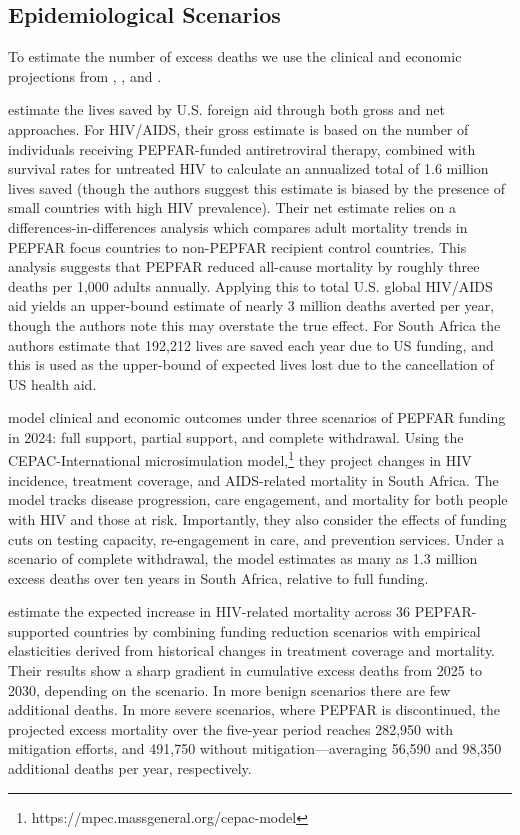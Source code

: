 \documentclass[letterpaper,12pt]{article}
\theoremstyle{definition}
\begin{document}
\begin{spacing}{1.5}
\subsection{Epidemiological Scenarios}
To estimate the number of excess deaths we use the clinical and economic projections from \citet{KS2025}, \citet{Gandhi2025}, and \citet{Brink2025}.

\citet{KS2025} estimate the lives saved by U.S. foreign aid through both gross and net approaches. For HIV/AIDS, their gross estimate is based on the number of individuals receiving PEPFAR-funded antiretroviral therapy, combined with survival rates for untreated HIV to calculate an annualized total of 1.6 million lives saved (though the authors suggest this estimate is biased by the presence of small countries with high HIV prevalence). Their net estimate relies on a differences-in-differences analysis which compares adult mortality trends in PEPFAR focus countries to non-PEPFAR recipient control countries. This analysis suggests that PEPFAR reduced all-cause mortality by roughly three deaths per 1,000 adults annually. Applying this to total U.S. global HIV/AIDS aid yields an upper-bound estimate of nearly 3 million deaths averted per year, though the authors note this may overstate the true effect. For South Africa the authors estimate that 192,212 lives are saved each year due to US funding, and this is used as the upper-bound of expected lives lost due to the cancellation of US health aid.

\citet{Gandhi2025} model clinical and economic outcomes under three scenarios of PEPFAR funding in 2024: full support, partial support, and complete withdrawal. Using the CEPAC-International microsimulation model,\footnote{https://mpec.massgeneral.org/cepac-model} they project changes in HIV incidence, treatment coverage, and AIDS-related mortality in South Africa. The model tracks disease progression, care engagement, and mortality for both people with HIV and those at risk. Importantly, they also consider the effects of funding cuts on testing capacity, re-engagement in care, and prevention services. Under a scenario of complete withdrawal, the model estimates as many as 1.3 million excess deaths over ten years in South Africa, relative to full funding.

 estimate the expected increase in HIV-related mortality across 36 PEPFAR-supported countries by combining funding reduction scenarios with empirical elasticities derived from historical changes in treatment coverage and mortality. Their results show a sharp gradient in cumulative excess deaths from 2025 to 2030, depending on the scenario. In more benign scenarios there are few additional deaths. In more severe scenarios, where PEPFAR is discontinued, the projected excess mortality over the five-year period reaches 282,950 with mitigation efforts, and 491,750 without mitigation—averaging 56,590 and 98,350 additional deaths per year, respectively.



\end{spacing}
\end{document}
